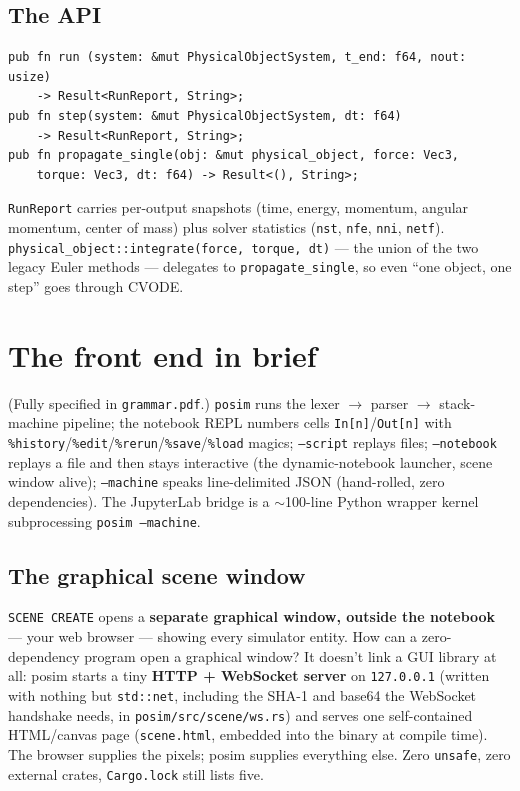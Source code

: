 \documentclass[11pt]{article}
\newcommand{\code}[1]{\texttt{#1}}
\begin{document}
\subsection{The API}
\begin{lstlisting}[language=RustLite]
pub fn run (system: &mut PhysicalObjectSystem, t_end: f64, nout: usize)
    -> Result<RunReport, String>;
pub fn step(system: &mut PhysicalObjectSystem, dt: f64)
    -> Result<RunReport, String>;
pub fn propagate_single(obj: &mut physical_object, force: Vec3,
    torque: Vec3, dt: f64) -> Result<(), String>;
\end{lstlisting}
\code{RunReport} carries per-output snapshots (time, energy, momentum,
angular momentum, center of mass) plus solver statistics
(\code{nst}, \code{nfe}, \code{nni}, \code{netf}).
\code{physical\_object::integrate(force, torque, dt)} --- the union of
the two legacy Euler methods --- delegates to
\code{propagate\_single}, so even ``one object, one step'' goes through
CVODE.

\section{The front end in brief}

(Fully specified in \code{grammar.pdf}.) \code{posim} runs the
lexer $\to$ parser $\to$ stack-machine pipeline; the notebook REPL
numbers cells \code{In[n]}/\code{Out[n]} with
\code{\%history}/\code{\%edit}/\code{\%rerun}/\code{\%save}/\code{\%load}
magics; \code{--script} replays files; \code{--notebook} replays a
file and then stays interactive (the dynamic-notebook launcher,
scene window alive); \code{--machine} speaks
line-delimited JSON (hand-rolled, zero dependencies). The JupyterLab
bridge is a $\sim$100-line Python wrapper kernel subprocessing
\code{posim --machine}.

\subsection{The graphical scene window}

\code{SCENE CREATE} opens a \textbf{separate graphical window, outside
the notebook} --- your web browser --- showing every simulator entity.
How can a zero-dependency program open a graphical window? It doesn't
link a GUI library at all: posim starts a tiny \textbf{HTTP +
WebSocket server} on \code{127.0.0.1} (written with nothing but
\code{std::net}, including the SHA-1 and base64 the WebSocket handshake
needs, in \code{posim/src/scene/ws.rs}) and serves one self-contained
HTML/canvas page (\code{scene.html}, embedded into the binary at
compile time). The browser supplies the pixels; posim supplies
everything else. Zero \code{unsafe}, zero external crates,
\code{Cargo.lock} still lists five.
\end{document}
